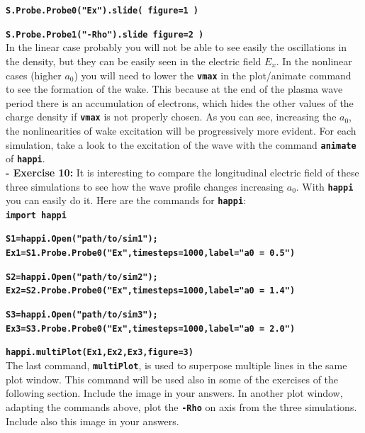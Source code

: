 \documentclass[a4paper,12pt]{extarticle}
\newcommand{\commandline}[1]{\texttt{\textbf{#1}}}
\begin{document}
\commandline{S.Probe.Probe0("Ex").slide( figure=1 )}

\commandline{S.Probe.Probe1("-Rho").slide figure=2 )}\\

In the linear case probably you will not be able to see easily the oscillations in the density, but they can be easily seen in the electric field $E_x$. In the nonlinear cases (higher $a_0$) you will need to lower the \commandline{vmax} in the plot/animate command to see the formation of  the wake. This because at the end of the plasma wave period there is an accumulation of electrons, which hides the other values of the charge density if \commandline{vmax}  is not properly chosen.
As you can see, increasing the $a_0$, the nonlinearities of wake excitation will be progressively more evident. For each simulation, take a look to the excitation of the wave with the command \commandline{animate} of \commandline{happi}.\\

\textbf{ - Exercise 10:} It is interesting to compare the longitudinal electric field of these three simulations to see how the wave profile changes increasing $a_0$. With \commandline{happi} you can easily do it. Here are the commands for \commandline{happi}:\\

\commandline{import happi}

\small{\commandline{S1=happi.Open("path/to/sim1"); Ex1=S1.Probe.Probe0("Ex",timesteps=1000,label="a0 = 0.5")}}

\commandline{S2=happi.Open("path/to/sim2"); Ex2=S2.Probe.Probe0("Ex",timesteps=1000,label="a0 = 1.4")}

\commandline{S3=happi.Open("path/to/sim3"); Ex3=S3.Probe.Probe0("Ex",timesteps=1000,label="a0 = 2.0")}

\commandline{happi.multiPlot(Ex1,Ex2,Ex3,figure=3)}\\

The last command, \commandline{multiPlot}, is used to superpose multiple lines in the same plot window.  This command will be used also in some of the exercises of the following section.  Include the image in your answers.
In another plot window, adapting the commands above, plot the \commandline{-Rho} on axis from the three simulations. Include also this image in your answers. 
\end{document}
